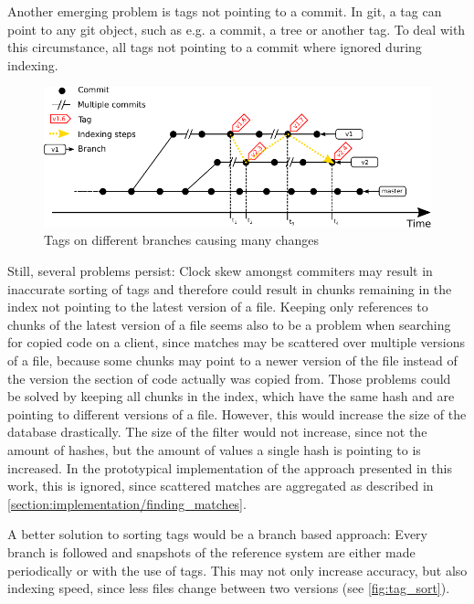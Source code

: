 Another emerging problem is tags not pointing to a commit.
In git, a tag can point to any git object, such as e.g. a commit, a tree or another tag.
To deal with this circumstance, all tags not pointing to a commit where ignored during indexing.

\begin{figure}[h]
	\centering
	\includegraphics{figures/tag_sort.pdf}
	\caption{Tags on different branches causing many changes}\label{fig:tag_sort}
\end{figure}

Still, several problems persist: 
Clock skew amongst commiters may result in inaccurate sorting of tags and therefore could result in chunks remaining in the index not pointing to the latest version of a file.
Keeping only references to chunks of the latest version of a file seems also to be a problem when searching for copied code on a client, since matches may be scattered over multiple versions of a file, because some chunks may point to a newer version of the file instead of the version the section of code actually was copied from.
Those problems could be solved by keeping all chunks in the index, which have the same hash and are pointing to different versions of a file.
However, this would increase the size of the database drastically.
The size of the filter would not increase, since not the amount of hashes, but the amount of values a single hash is pointing to is increased.
In the prototypical implementation of the approach presented in this work, this is ignored, since scattered matches are aggregated as described in \ref{section:implementation/finding_matches}.

A better solution to sorting tags would be a branch based approach:
Every branch is followed and snapshots of the reference system are either made periodically or with the use of tags.
This may not only increase accuracy, but also indexing speed, since less files change between two versions (see \autoref{fig:tag_sort}).

